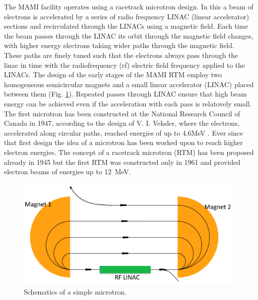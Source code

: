 \indent The MAMI facility operates using a racetrack microtron design.  In this a beam of electrons is accelerated by a series of radio frequency LINAC (linear accelerator) sections and recirculated through the LINACs using a magnetic field. Each time the beam passes through the LINAC its orbit through the magnetic field changes, with higher energy electrons taking wider paths through the magnetic field. These paths are finely tuned such that the electrons always pass through the linac in time with the radiofrequency (rf) electric field frequency applied to the LINACs.  The design of the early stages of the MAMI RTM employ two homogeneous semicircular magnets and a small linear accelerator (LINAC) placed between them (Fig. \ref{microtronplot}).
Repeated passes through LINAC ensure that high beam energy can be achieved even if the acceleration with each pass is relatovely small. The first microtron has been constructed at the National Research Council of Canada in 1947, according to the design of V. I. Veksler, where the electrons, accelerated along circular paths, reached energies of up to 4.6MeV \cite{dehn}. Ever since that first design the idea of a microtron has been worked upon to reach higher electron energies. The concept of a  racetrack microtron (RTM) has been proposed already in 1945 but the first RTM was constructed only in 1961 and provided electron beams of energies up to 12~MeV. 
\begin{figure}[H]
\begin{center}
\includegraphics[scale=0.55]{rfm.png}
\caption{Schematics of a simple microtron.}
\label{microtronplot}
\end{center}
\end{figure}

